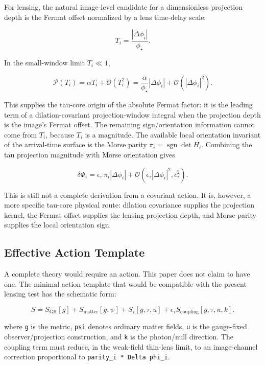 \documentclass[11pt]{article}
\begin{document}
For lensing, the natural image-level candidate for a dimensionless
projection depth is the Fermat offset normalized by a lens time-delay
scale:

\[
T_i
=
\frac{|\Delta\phi_i|}{\phi_\star}.
\]

In the small-window limit \(T_i\ll 1\),

\[
\mathcal{P}(T_i)
=
\alpha T_i
+\mathcal{O}(T_i^2)
=
\frac{\alpha}{\phi_\star}|\Delta\phi_i|
+\mathcal{O}(|\Delta\phi_i|^2).
\]

This supplies the tau-core origin of the absolute Fermat factor: it is
the leading term of a dilation-covariant projection-window integral when
the projection depth is the image's Fermat offset. The remaining
sign/orientation information cannot come from \(T_i\), because \(T_i\)
is a magnitude. The available local orientation invariant of the
arrival-time surface is the Morse parity
\(\pi_i=\operatorname{sgn}\det H_i\). Combining the tau projection
magnitude with Morse orientation gives

\[
\delta\Phi_i
=
\epsilon_\tau\,\pi_i|\Delta\phi_i|
+\mathcal{O}(\epsilon_\tau|\Delta\phi_i|^2,\epsilon_\tau^2).
\]

This is still not a complete derivation from a covariant action. It is,
however, a more specific tau-core physical route: dilation covariance
supplies the projection kernel, the Fermat offset supplies the lensing
projection depth, and Morse parity supplies the local orientation sign.

\subsection{Effective Action
Template}\label{effective-action-template}

A complete theory would require an action. This paper does not claim to
have one. The minimal action template that would be compatible with the
present lensing test has the schematic form:

\[
S =
S_\mathrm{GR}[g]
+ S_\mathrm{matter}[g,\psi]
+ S_\tau[g,\tau,u]
+ \epsilon_\tau S_\mathrm{coupling}[g,\tau,u,k].
\]

where \texttt{g} is the metric, \texttt{psi} denotes ordinary matter
fields, \texttt{u} is the gauge-fixed observer/projection construction,
and \texttt{k} is the photon/null direction. The coupling term must
reduce, in the weak-field thin-lens limit, to an image-channel
correction proportional to
\texttt{parity\_i\ *\ \textbar{}Delta\ phi\_i\textbar{}}.
\end{document}
